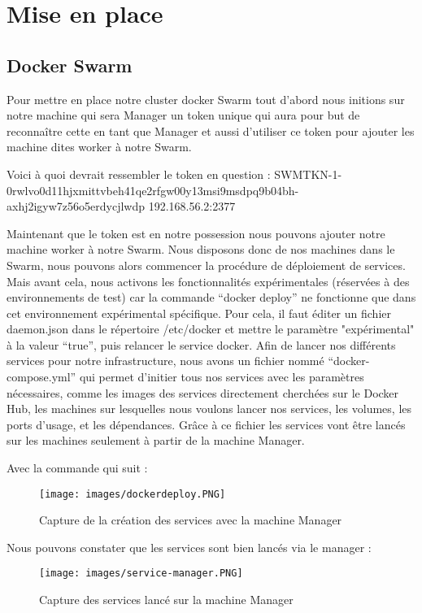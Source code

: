 \documentclass[oneside,12pt]{report}
\begin{document}
\section{Mise en place}
\subsection{Docker Swarm}

Pour mettre en place notre cluster docker Swarm tout d'abord nous initions sur notre machine qui sera Manager un token unique qui aura pour but de reconnaître cette en tant que Manager et aussi d'utiliser ce token pour ajouter les machine dites worker à notre Swarm.
\newline

Voici à quoi devrait ressembler le token en question :
\newline
SWMTKN-1-0rwlvo0d11hjxmittvbeh41qe2rfgw00y13msi9msdpq9b04bh-axhj2igyw7z56o5erdycjlwdp 192.168.56.2:2377
\newline

Maintenant que le token est en notre possession nous pouvons ajouter notre machine worker à notre Swarm.
Nous disposons donc de nos machines dans le Swarm, nous pouvons alors commencer la procédure de déploiement de services. Mais avant cela, nous activons les fonctionnalités expérimentales (réservées à des environnements de test) car la commande “docker deploy” ne fonctionne que dans cet environnement expérimental spécifique. Pour cela, il faut éditer un fichier daemon.json dans le répertoire /etc/docker et mettre le paramètre "expérimental" à la valeur “true”, puis relancer le service docker.
Afin de lancer nos différents services pour notre infrastructure, nous avons un fichier nommé “docker-compose.yml” qui permet d'initier tous nos services avec les paramètres nécessaires, comme les images des services directement cherchées sur le Docker Hub, les machines sur lesquelles nous voulons lancer nos services, les volumes, les ports d'usage, et les dépendances. Grâce à ce fichier les services vont être lancés sur les machines seulement à partir de la machine Manager.\newline

Avec la commande qui suit :
\begin{figure}[H]
    \centering
    \texttt{[image: images/dockerdeploy.PNG]}
    \caption{Capture de la création des services avec la machine Manager}
    \label{fig:mesh1}
\end{figure}

Nous pouvons constater que les services sont bien lancés via le manager :
\begin{figure}[H]
    \centering
    \texttt{[image: images/service-manager.PNG]}
    \caption{Capture des services lancé sur la machine Manager}
    \label{fig:mesh1}
\end{figure}
\end{document}
